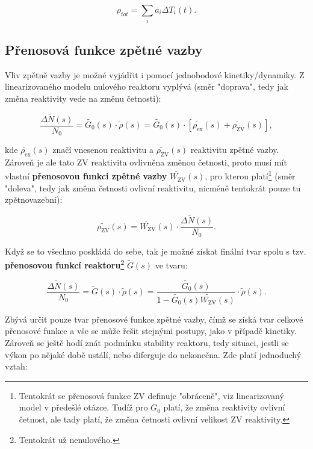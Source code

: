 \begin{equation}
  \boxed{
  \rho_{tot} = \sum_i a_i \Delta T_i (t).
  \label{zpetnovazebni_koeficient_reaktivita_1B}
  }
\end{equation}

\subsection{Přenosová funkce zpětné vazby}

Vliv zpětně vazby je možné vyjádřit i pomocí jednobodové kinetiky/dynamiky. Z linearizovaného modelu nulového reaktoru vyplývá (směr "doprava", tedy jak změna reaktivity vede na změnu četnosti):

$$ \dfrac{\Delta \tilde{N}(s)}{N_0} = \tilde{G_0}(s) \cdot \tilde{\rho}(s) = \tilde{G_0}(s) \cdot [ \tilde{\rho_\text{ex}}(s) + \tilde{\rho_\text{ZV}}(s) ], $$

kde $\tilde{\rho_\text{ex}}(s)$ značí vnesenou reaktivitu a $\tilde{\rho_\text{ZV}}(s)$ reaktivitu zpětné vazby. Zároveň je ale tato ZV reaktivita ovlivněna změnou četnosti, proto musí mít vlastní \textbf{přenosovou funkci zpětné vazby} $\tilde{W_\text{ZV}}(s)$, pro kterou platí\footnote{Tentokrát se přenosová funkce ZV definuje "obráceně", viz linearizovaný model v předešlé otázce. Tudíž pro $G_0$ platí, že změna reaktivity ovlivní četnost, ale tady platí, že změna četnosti ovlivní velikost ZV reaktivity.} (směr "doleva", tedy jak změna četnosti ovlivní reaktivitu, nicméně tentokrát pouze tu zpětnovazební):

$$ \tilde{\rho_\text{ZV}}(s) = \tilde{W_\text{ZV}}(s) \cdot \dfrac{\Delta \tilde{N}(s)}{N_0}. $$

Když se to všechno poskládá do sebe, tak je možné získat finální tvar spolu s tzv. \textbf{přenosovou funkcí reaktoru}\footnote{Tentokrát už nenulového.} $\tilde{G}(s)$ ve tvaru:

\begin{equation}
  \boxed{
    \dfrac{\Delta \tilde{N}(s)}{N_0} = \tilde{G}(s) \cdot \tilde{\rho}(s) = \dfrac{\tilde{G_0}(s)}{1 - \tilde{G_0}(s) \tilde{W_\text{ZV}}(s)} \cdot \tilde{\rho}(s).
  }
\end{equation}

Zbývá určit pouze tvar přenosové funkce zpětné vazby, čímž se získá tvar celkové přenosové funkce a vše se může řešit stejnými postupy, jako v případě kinetiky.\\

Zároveň se ještě hodí znát podmínku stability reaktoru, tedy situaci, jestli se výkon po nějaké době ustálí, nebo diferguje do nekonečna. Zde platí jednoduchý vztah:

